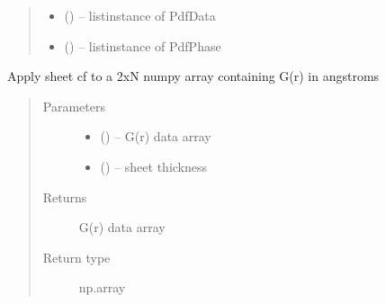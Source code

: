 \documentclass[letterpaper,10pt,english]{sphinxmanual}
\begin{document}
\begin{fulllineitems}
\begin{fulllineitems}
\begin{quote}
\begin{description}
\begin{itemize}
\item {} 
 ({\hyperref[\detokenize{rst/pairdistributionfunction:mstack.pairdistributionfunction.PdfData}]{}}\sphinxstyleliteralemphasis{(}\sphinxstyleliteralemphasis{)}\sphinxstyleliteralemphasis{}) -- list\textbar{}instance of PdfData

\item {} 
 (\sphinxstyleliteralemphasis{(}\sphinxstyleliteralemphasis{)}\sphinxstyleliteralemphasis{}) -- list\textbar{}instance of PdfPhase

\end{itemize}

\end{description}\end{quote}

\end{fulllineitems}


\begin{fulllineitems}
\label{\detokenize{rst/pairdistributionfunction:mstack.pairdistributionfunction.PdfRefinement.apply_sheetcf}}
Apply sheet cf to a 2xN numpy array containing G(r) in angstroms
\begin{quote}\begin{description}
\item[{Parameters}] \leavevmode\begin{itemize}
\item {} 
 () -- G(r) data array

\item {} 
 () -- sheet thickness

\end{itemize}

\item[{Returns}] \leavevmode
G(r) data array

\item[{Return type}] \leavevmode
np.array

\end{description}\end{quote}


\end{fulllineitems}
\end{fulllineitems}
\end{document}
